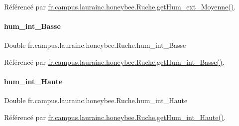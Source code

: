 Référencé par \hyperlink{classfr_1_1campus_1_1laurainc_1_1honeybee_1_1_ruche_a354b16d6aa62f6b8b147be86fc3ca772}{fr.\+campus.\+laurainc.\+honeybee.\+Ruche.\+get\+Hum\+\_\+ext\+\_\+\+Moyenne()}.

\mbox{\label{classfr_1_1campus_1_1laurainc_1_1honeybee_1_1_ruche_a5d7949f1f6daa28454a0a5468faab337}} 
\paragraph{\texorpdfstring{hum\+\_\+int\+\_\+\+Basse}{hum\_int\_Basse}}
{\footnotesize\ttfamily Double fr.\+campus.\+laurainc.\+honeybee.\+Ruche.\+hum\+\_\+int\+\_\+\+Basse\hspace{0.3cm}{\ttfamily [private]}}



Référencé par \hyperlink{classfr_1_1campus_1_1laurainc_1_1honeybee_1_1_ruche_a57efc0899720f55778f4ed42157e4eb3}{fr.\+campus.\+laurainc.\+honeybee.\+Ruche.\+get\+Hum\+\_\+int\+\_\+\+Basse()}.

\mbox{\label{classfr_1_1campus_1_1laurainc_1_1honeybee_1_1_ruche_ac6b4da59e8ad8537926cc4ca7a6d4746}} 
\paragraph{\texorpdfstring{hum\+\_\+int\+\_\+\+Haute}{hum\_int\_Haute}}
{\footnotesize\ttfamily Double fr.\+campus.\+laurainc.\+honeybee.\+Ruche.\+hum\+\_\+int\+\_\+\+Haute\hspace{0.3cm}{\ttfamily [private]}}



Référencé par \hyperlink{classfr_1_1campus_1_1laurainc_1_1honeybee_1_1_ruche_a7b4dfda126b3cb0c370e89ac8a646a9d}{fr.\+campus.\+laurainc.\+honeybee.\+Ruche.\+get\+Hum\+\_\+int\+\_\+\+Haute()}.

